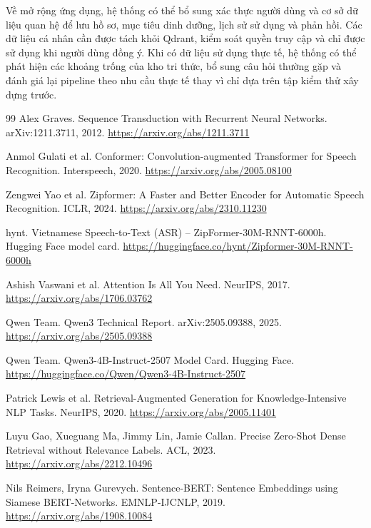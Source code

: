 \documentclass[a4paper,13pt,twoside]{report}
\begin{document}
Về mở rộng ứng dụng, hệ thống có thể bổ sung xác thực người dùng và cơ sở dữ liệu quan hệ để lưu hồ sơ, mục tiêu dinh dưỡng, lịch sử sử dụng và phản hồi. Các dữ liệu cá nhân cần được tách khỏi Qdrant, kiểm soát quyền truy cập và chỉ được sử dụng khi người dùng đồng ý. Khi có dữ liệu sử dụng thực tế, hệ thống có thể phát hiện các khoảng trống của kho tri thức, bổ sung câu hỏi thường gặp và đánh giá lại pipeline theo nhu cầu thực tế thay vì chỉ dựa trên tập kiểm thử xây dựng trước.

\begin{thebibliography}{99}
    Alex Graves. Sequence Transduction with Recurrent Neural Networks. arXiv:1211.3711, 2012. \url{https://arxiv.org/abs/1211.3711}

    Anmol Gulati et al. Conformer: Convolution-augmented Transformer for Speech Recognition. Interspeech, 2020. \url{https://arxiv.org/abs/2005.08100}

    Zengwei Yao et al. Zipformer: A Faster and Better Encoder for Automatic Speech Recognition. ICLR, 2024. \url{https://arxiv.org/abs/2310.11230}

    hynt. Vietnamese Speech-to-Text (ASR) -- ZipFormer-30M-RNNT-6000h. Hugging Face model card. \url{https://huggingface.co/hynt/Zipformer-30M-RNNT-6000h}

    Ashish Vaswani et al. Attention Is All You Need. NeurIPS, 2017. \url{https://arxiv.org/abs/1706.03762}

    Qwen Team. Qwen3 Technical Report. arXiv:2505.09388, 2025. \url{https://arxiv.org/abs/2505.09388}

    Qwen Team. Qwen3-4B-Instruct-2507 Model Card. Hugging Face. \url{https://huggingface.co/Qwen/Qwen3-4B-Instruct-2507}

    Patrick Lewis et al. Retrieval-Augmented Generation for Knowledge-Intensive NLP Tasks. NeurIPS, 2020. \url{https://arxiv.org/abs/2005.11401}

    Luyu Gao, Xueguang Ma, Jimmy Lin, Jamie Callan. Precise Zero-Shot Dense Retrieval without Relevance Labels. ACL, 2023. \url{https://arxiv.org/abs/2212.10496}

    Nils Reimers, Iryna Gurevych. Sentence-BERT: Sentence Embeddings using Siamese BERT-Networks. EMNLP-IJCNLP, 2019. \url{https://arxiv.org/abs/1908.10084}


\end{thebibliography}
\end{document}
